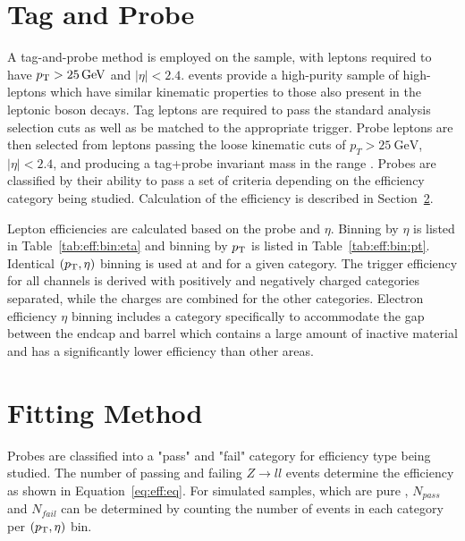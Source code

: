 % 
% 


\section{Tag and Probe}\label{ch:eff:tagandprobe}
A tag-and-probe method is employed on the \zll sample, with leptons required to have $p_{\mathrm{T}}>25\,\text{Ge\hspace{-.08em}V}$ and $|\eta|<2.4$. \zll events provide a high-purity sample of high-\pt leptons which have similar kinematic properties to those also present in the leptonic \W boson decays\cite{Khachatryan:2010xn}. Tag leptons are required to pass the standard analysis selection cuts as well as be matched to the appropriate trigger. Probe leptons are then selected from leptons passing the loose kinematic cuts of $p_T > 25 \mathrm{~GeV}$,~$|\eta|<2.4$, and producing a tag+probe invariant mass in the range \masswindow. Probes are classified by their ability to pass a set of criteria depending on the efficiency category being studied. Calculation of the efficiency is described in Section~\ref{ch:eff:fitting}.

Lepton efficiencies are calculated based on the probe \pt and $\eta$. Binning by $\eta$ is listed in Table~\ref{tab:eff:bin:eta} and binning by $p_{\mathrm{T}}$ is listed in Table~\ref{tab:eff:bin:pt}. Identical $(p_{\mathrm{T}},\eta)$ binning is used at \sg and \sh for a given category. The trigger efficiency for all channels is derived with positively and negatively charged categories separated, while the charges are combined for the other categories\cite{CMS:2020ksi}. Electron efficiency $\eta$ binning includes a category specifically to accommodate the gap between the endcap and barrel which contains a large amount of inactive material and has a significantly lower efficiency than other areas.






\section{Fitting Method}\label{ch:eff:fitting}
Probes are classified into a "pass" and "fail" category for efficiency type being studied. The number of passing and failing $Z\rightarrow ll$ events determine the efficiency as shown in Equation~\ref{eq:eff:eq}. For simulated samples, which are pure \zll, $N_{pass}$ and $N_{fail}$ can be determined by counting the number of events in each category per $(p_{\mathrm{T}},\eta)$ bin. 

